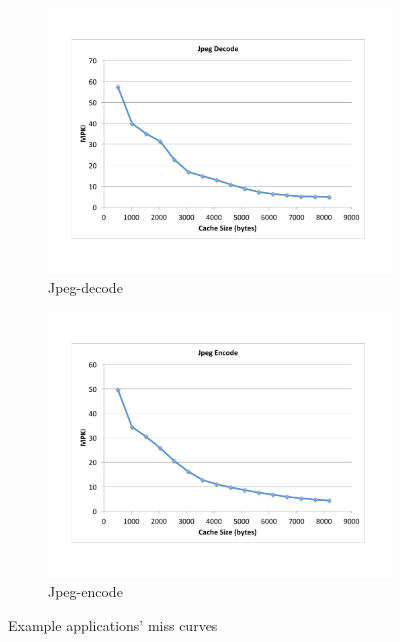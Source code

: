 \documentclass{acm_proc_article-sp}
\begin{document}
\begin{figure}
  \begin{subfigure}[b]{0.25\textwidth}
    \includegraphics[width=\textwidth]{figs/jpeg-decode-miss-curve.pdf}
    \caption{Jpeg-decode}
    \label{fig:jpeg-decode}
  \end{subfigure}%
  \begin{subfigure}[b]{0.25\textwidth}
    \includegraphics[width=\textwidth]{figs/jpeg-encode-miss-curve.pdf}
    \caption{Jpeg-encode}
    \label{fig:jpeg-encode}
  \end{subfigure}
  \caption{Example applications' miss curves}
  \label{fig:miss-curve}
\end{figure}
\end{document}

